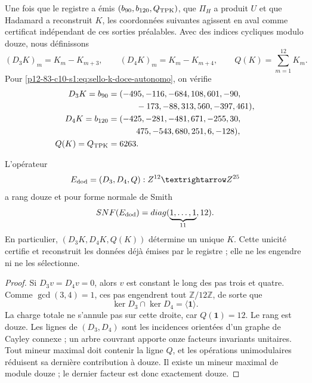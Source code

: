 Une fois que le registre a émis \((b_{90},b_{120},Q_{\rm TPK})\), que
\(\Pi_H\) a produit \(U\) et que Hadamard a reconstruit \(K\), les
coordonnées suivantes agissent en aval comme certificat indépendant de
ces sorties préalables. Avec des indices cycliques modulo douze, nous définissons
\begin{equation}
 (D_3K)_m=K_m-K_{m+3},
 \qquad
 (D_4K)_m=K_m-K_{m+4},
 \qquad
 Q(K)=\sum_{m=1}^{12}K_m.
 \label{p12-83-c10-s1:eq:extractor-diferencias-k}
\end{equation}
Pour \eqref{p12-83-c10-s1:eq:sello-k-doce-autonomo}, on vérifie
\begin{align*}
 D_3K=b_{90}={}&(-495,-116,-684,108,601,-90,\\
         &\qquad-173,-88,313,560,-397,461),\\
 D_4K=b_{120}={}&(-425,-281,-481,671,-255,30,\\
         &\qquad475,-543,680,251,6,-128),\\
 Q(K)=Q_{\rm TPK}={}&6263.
\end{align*}

\begin{theorem}
\label{p12-83-c10-s1:thm:completitud-extractor-transversal-k}
L'opérateur
\[
 \mathcal E_{\rm dod}=(D_3,D_4,Q):
 \mathbb Z^{12}\longrightarrow\mathbb Z^{25}
\]
a rang douze et pour forme normale de Smith
\begin{equation}
 \operatorname{SNF}(\mathcal E_{\rm dod})
 =\operatorname{diag}(\underbrace{1,\ldots,1}_{11},12).
 \label{p12-83-c10-s1:eq:snf-extractor-transversal-k}
\end{equation}
En particulier, \((D_3K,D_4K,Q(K))\) détermine un unique \(K\). Cette
unicité certifie et reconstruit les données déjà émises par le registre ; elle ne les
engendre ni ne les sélectionne.
\end{theorem}

\begin{proof}
Si \(D_3v=D_4v=0\), alors \(v\) est constant le long des pas
trois et quatre. Comme \(\gcd(3,4)=1\), ces pas engendrent tout
\(\mathbb Z/12\mathbb Z\), de sorte que
\[
 \ker D_3\cap\ker D_4=\langle\mathbf1\rangle.
\]
La charge totale ne s’annule pas sur cette droite, car \(Q(\mathbf1)=12\). Le rang
est douze. Les lignes de \((D_3,D_4)\) sont les incidences orientées d’un graphe
de Cayley connexe ; un arbre couvrant apporte onze facteurs invariants
unitaires. Tout mineur maximal doit contenir la ligne \(Q\), et les opérations
unimodulaires réduisent sa dernière contribution à douze. Il existe un mineur maximal de
module douze ; le dernier facteur est donc exactement douze.
\end{proof}

